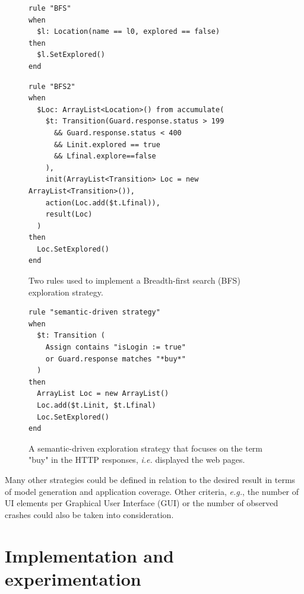 \begin{figure}[h]
\begin{framed}
\begin{BVerbatim}
rule "BFS"
when
  $l: Location(name == l0, explored == false)
then
  $l.SetExplored()
end
\end{BVerbatim}
\end{framed}

\begin{framed}
\begin{BVerbatim}
rule "BFS2"
when
  $Loc: ArrayList<Location>() from accumulate(
    $t: Transition(Guard.response.status > 199
      && Guard.response.status < 400
      && Linit.explored == true
      && Lfinal.explore==false
    ),
    init(ArrayList<Transition> Loc = new ArrayList<Transition>()),
    action(Loc.add($t.Lfinal)),
    result(Loc)
  )
then
  Loc.SetExplored()
end
\end{BVerbatim}
\end{framed}

\caption{Two rules used to implement a Breadth-first search (BFS)
exploration strategy.}
\label{fig:rule:bfs}
\end{figure}

\begin{figure}[h]
\begin{framed}
\begin{BVerbatim}
rule "semantic-driven strategy"
when
  $t: Transition (
    Assign contains "isLogin := true"
    or Guard.response matches "*buy*"
  )
then
  ArrayList Loc = new ArrayList()
  Loc.add($t.Linit, $t.Lfinal)
  Loc.SetExplored()
end
\end{BVerbatim}
\end{framed}

\caption{A semantic-driven exploration strategy that focuses on
the term "buy" in the HTTP responses, \emph{i.e.} displayed the web
pages.}
\label{fig:rule:semdriven}
\end{figure}

Many other strategies could be defined in relation to the desired
result in terms of model generation and application coverage.
Other criteria, \emph{e.g.}, the number of UI elements per Graphical User
Interface (GUI) or the number of observed crashes could also be
taken into consideration.


\section{Implementation and experimentation}
\label{sec:modelinf:webapps:exp}

